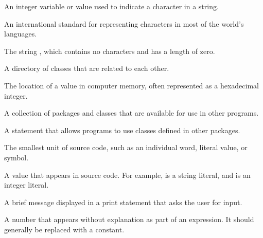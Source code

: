 \begin{description}

An integer variable or value used to indicate a character in a string.

An international standard for representing characters in most of the world's languages.

The string , which contains no characters and has a length of zero.

A directory of classes that are related to each other.

The location of a value in computer memory, often represented as a hexadecimal integer.

A collection of packages and classes that are available for use in other programs.





A statement that allows programs to use classes defined in other packages.

The smallest unit of source code, such as an individual word, literal value, or symbol.



A value that appears in source code.
For example,  is a string literal, and  is an integer literal.

A brief message displayed in a print statement that asks the user for input.

A number that appears without explanation as part of an expression.
It should generally be replaced with a constant.


\end{description}
